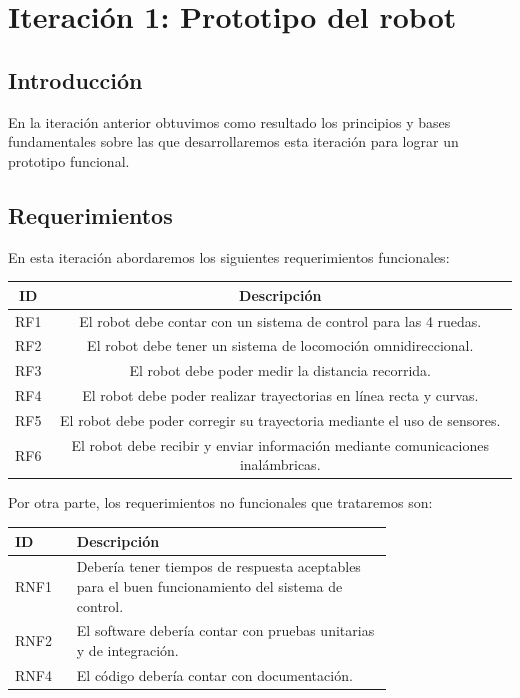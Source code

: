 \newpage
\section{Iteración 1: Prototipo del robot}

\subsection{Introducción}
En la iteración anterior obtuvimos como resultado los principios y bases fundamentales sobre las que desarrollaremos esta iteración para lograr un prototipo funcional.

\subsection{Requerimientos}
En esta iteración abordaremos los siguientes requerimientos funcionales:

\begin{center} \begin{tabular}{|c|c|}
\hline
    ID & Descripción \\
\hline
    RF1 & El robot debe contar con un sistema de control para las 4 ruedas. \\ 
\hline
    RF2 & El robot debe tener un sistema de locomoción omnidireccional. \\ 
\hline
    RF3 & El robot debe poder medir la distancia recorrida. \\ 
\hline
    RF4 & El robot debe poder realizar trayectorias en línea recta y curvas. \\ 
\hline
    RF5 & El robot debe poder corregir su trayectoria mediante el uso de sensores. \\  
\hline
    RF6 & El robot debe recibir y enviar información mediante comunicaciones inalámbricas. \\ 
\hline
\end{tabular} \end{center}

Por otra parte, los requerimientos no funcionales que trataremos son:

\begin{center} \begin{tabular}{|p{0.10\linewidth}|p{0.65\linewidth}|}
\hline
    ID & Descripción \\
\hline
    RNF1 & Debería tener tiempos de respuesta aceptables para el buen funcionamiento del sistema de control. \\
\hline
    RNF2 & El software debería contar con pruebas unitarias y de integración. \\
\hline
    RNF4 & El código debería contar con documentación.\\
\hline
\end{tabular} \end{center}

